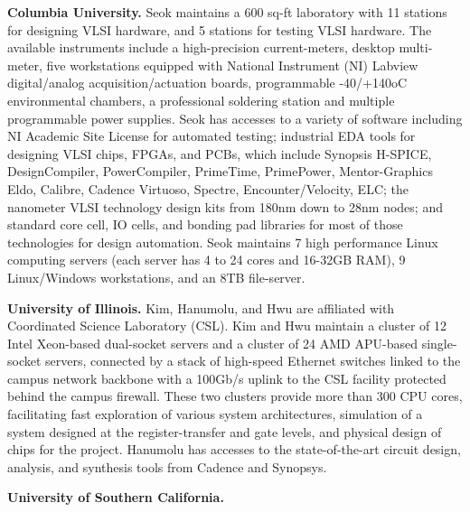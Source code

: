 \noindent
\textbf{Columbia University.} 
Seok maintains a 600 sq-ft laboratory with 11 stations for designing VLSI hardware, and 5 stations for testing VLSI hardware. 
The available instruments include a high-precision current-meters, desktop multi-meter, five workstations equipped with National Instrument (NI) Labview digital/analog acquisition/actuation boards, programmable -40/+140oC environmental chambers, a professional soldering station and multiple programmable power supplies. 
Seok has accesses to a variety of software including NI Academic Site License for automated testing; industrial EDA tools for designing VLSI chips, FPGAs, and PCBs, which include Synopsis H-SPICE, DesignCompiler, PowerCompiler, PrimeTime, PrimePower, Mentor-Graphics Eldo, Calibre, Cadence Virtuoso, Spectre, Encounter/Velocity, ELC; the nanometer VLSI technology design kits from 180nm down to 28nm nodes; and standard core cell, IO cells, and bonding pad libraries for most of those technologies for design automation. 
Seok maintains 7 high performance Linux computing servers (each server has 4 to 24 cores and 16-32GB RAM), 9 Linux/Windows workstations, and an 8TB file-server. 

\noindent
\textbf{University of Illinois.}
Kim, Hanumolu, and Hwu are affiliated with Coordinated Science Laboratory (CSL). 
Kim and Hwu maintain a cluster of 12 Intel Xeon-based dual-socket servers and a cluster of 24 AMD APU-based single-socket servers, 
connected by a stack of high-speed Ethernet switches linked to the campus network backbone with a 100Gb/s uplink to the CSL facility protected behind the campus firewall.
These two clusters provide more than 300 CPU cores, facilitating fast exploration of various system architectures, simulation of a system designed at the register-transfer and gate levels, and physical design of chips for the project.
Hanumolu has accesses to the state-of-the-art circuit design, analysis, and synthesis tools from Cadence and Synopsys.

\noindent
\textbf{University of Southern California.}
